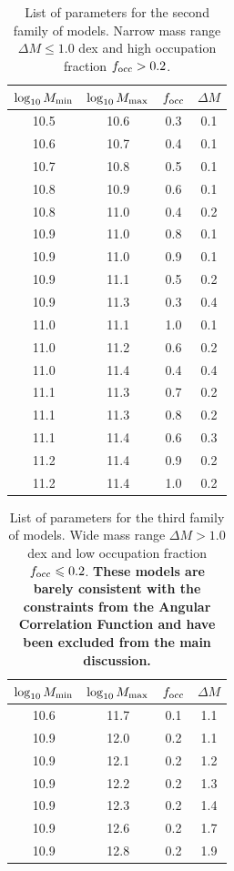 \documentclass[usenatbib]{mn2e}
\begin{document}
\begin{table}
\begin{center}
\begin{tabular}{cccc}\hline\hline
$\log_{10}M_{\rm min}$ & $\log_{10}M_{\rm max}$ & $f_{\rm occ}$ & $\Delta M$\\\hline
 10.5 &10.6 & 0.3 & 0.1 \\
 10.6 &10.7 & 0.4 & 0.1 \\
 10.7 &10.8 & 0.5 & 0.1 \\
 10.8 &10.9 & 0.6 & 0.1 \\
 10.8 &11.0 & 0.4 & 0.2 \\
 10.9 &11.0 & 0.8 & 0.1 \\
 10.9 &11.0 & 0.9 & 0.1 \\
 10.9 &11.1 & 0.5 & 0.2 \\
 10.9 &11.3 & 0.3 & 0.4 \\
 11.0 &11.1 & 1.0 & 0.1 \\
 11.0 &11.2 & 0.6 & 0.2 \\
 11.0 &11.4 & 0.4 & 0.4 \\
 11.1 &11.3 & 0.7 & 0.2 \\
 11.1 &11.3 & 0.8 & 0.2 \\
 11.1 &11.4 & 0.6 & 0.3 \\
 11.2 &11.4 & 0.9 & 0.2 \\
 11.2 &11.4 & 1.0 & 0.2 \\\hline
\end{tabular}
\end{center}
\caption{\label{table:secondfamily}List of parameters for the second
  family of models. Narrow mass range $\Delta M\leq 1.0 $ dex and high occupation fraction $f_{\rm occ}>0.2$.}
\end{table}


\begin{table}
\begin{center}
\begin{tabular}{cccc}\hline\hline
$\log_{10}M_{\rm min}$ & $\log_{10}M_{\rm max}$ & $f_{\rm occ}$ & $\Delta M$\\\hline
 10.6 &11.7 & 0.1& 1.1 \\
 10.9 &12.0 & 0.2& 1.1 \\
 10.9 &12.1 & 0.2& 1.2 \\
 10.9 &12.2 & 0.2& 1.3 \\
 10.9 &12.3 & 0.2& 1.4 \\
 10.9 &12.6 & 0.2& 1.7 \\
 10.9 &12.8 & 0.2& 1.9 \\\hline
\end{tabular}
\end{center}
\caption{\label{table:thirdfamily}List of parameters for the third
  family of models. Wide mass range $\Delta M> 1.0$ dex and low
  occupation fraction $f_{\rm occ}\leq 0.2$. {\bf These models are barely
  consistent with the constraints from the Angular Correlation
  Function and have been excluded from the main discussion.}} 
\end{table}
\end{document}
